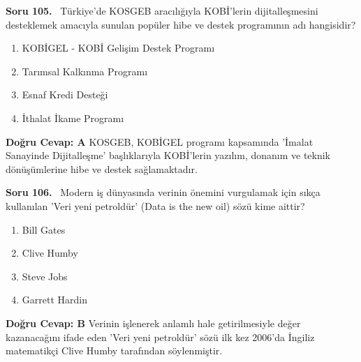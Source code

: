 \documentclass[11pt,a4paper,openany]{book}
\begin{document}
\needspace{5cm}
\vspace{8pt}
\noindent\textbf{\large\sffamily Soru 105.} \ Türkiye'de KOSGEB aracılığıyla KOBİ'lerin dijitalleşmesini desteklemek amacıyla sunulan popüler hibe ve destek programının adı hangisidir?
\begin{enumerate}[label=\Alph*), leftmargin=25pt, topsep=4pt, itemsep=2pt]
    \item KOBİGEL - KOBİ Gelişim Destek Programı
    \item Tarımsal Kalkınma Programı
    \item Esnaf Kredi Desteği
    \item İthalat İkame Programı
\end{enumerate}
\vspace{4pt}
\begin{tcolorbox}[title=Cevap ve Açıklama, colback=gray!3!white, colframe=primarycolor!90!black, arc=2mm, fonttitle=\bfseries\sffamily, top=6pt, bottom=6pt]
    \textbf{Doğru Cevap: A}
    \vspace{2pt}
    KOSGEB, KOBİGEL programı kapsamında 'İmalat Sanayinde Dijitalleşme' başlıklarıyla KOBİ'lerin yazılım, donanım ve teknik dönüşümlerine hibe ve destek sağlamaktadır.
\end{tcolorbox}
\vspace{10pt}

\needspace{5cm}
\vspace{8pt}
\noindent\textbf{\large\sffamily Soru 106.} \ Modern iş dünyasında verinin önemini vurgulamak için sıkça kullanılan 'Veri yeni petroldür' (Data is the new oil) sözü kime aittir?
\begin{enumerate}[label=\Alph*), leftmargin=25pt, topsep=4pt, itemsep=2pt]
    \item Bill Gates
    \item Clive Humby
    \item Steve Jobs
    \item Garrett Hardin
\end{enumerate}
\vspace{4pt}
\begin{tcolorbox}[title=Cevap ve Açıklama, colback=gray!3!white, colframe=primarycolor!90!black, arc=2mm, fonttitle=\bfseries\sffamily, top=6pt, bottom=6pt]
    \textbf{Doğru Cevap: B}
    \vspace{2pt}
    Verinin işlenerek anlamlı hale getirilmesiyle değer kazanacağını ifade eden 'Veri yeni petroldür' sözü ilk kez 2006'da İngiliz matematikçi Clive Humby tarafından söylenmiştir.
\end{tcolorbox}
\vspace{10pt}
\end{document}
